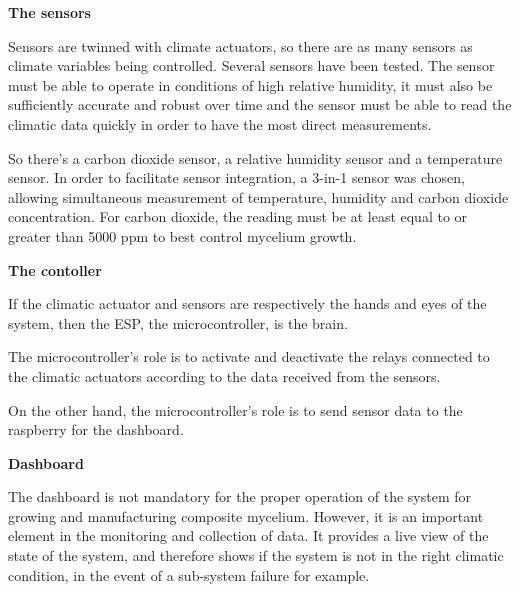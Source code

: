 
\textbf{The sensors}

Sensors are twinned with climate actuators, so there are as many sensors as climate variables being controlled. 
Several sensors have been tested. The sensor must be able to operate in conditions of high relative humidity, it must also be sufficiently accurate and robust over time and the sensor must be able to read the climatic data quickly in order to have the most direct measurements. 

So there's a carbon dioxide sensor, a relative humidity sensor and a temperature sensor. 
In order to facilitate sensor integration, a 3-in-1 sensor was chosen, allowing simultaneous measurement of temperature, humidity and carbon dioxide concentration. 
For carbon dioxide, the reading must be at least equal to or greater than 5000 ppm to best control mycelium growth. 

\textbf{The contoller}

If the climatic actuator and sensors are respectively the hands and eyes of the system, then the ESP, the microcontroller, is the brain. 

The microcontroller's role is to activate and deactivate the relays connected to the climatic actuators according to the data received from the sensors. 

On the other hand, the microcontroller's role is to send sensor data to the raspberry for the dashboard. 

\textbf{Dashboard}

The dashboard is not mandatory for the proper operation of the system for growing and manufacturing composite mycelium.
However, it is an important element in the monitoring and collection of data. It provides a live view of the state of the system, and therefore shows if the system is not in the right climatic condition, in the event of a sub-system failure for example.  


